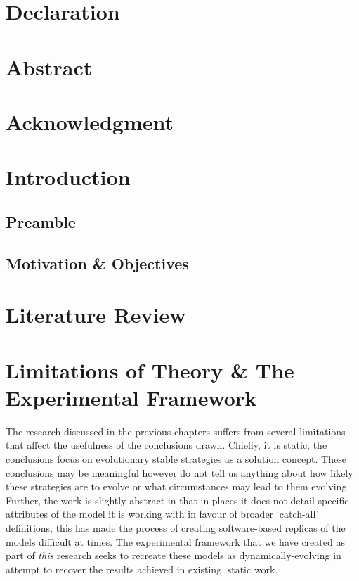 \documentclass[11pt]{book}
\begin{document}
\newpage
\chapter*{Declaration}
\chapter*{Abstract}
\chapter*{Acknowledgment}

\tableofcontents
\newpage
\chapter{Introduction}
\section{Preamble}
\section{Motivation \& Objectives}

\chapter{Literature Review}

\chapter[Theory vs. Practice]{Limitations of Theory \& The Experimental Framework}

The research discussed in the previous chapters suffers from several limitations that affect the usefulness of the conclusions drawn. 
Chiefly, it is static; the conclusions focus on evolutionary stable strategies as a solution concept.
These conclusions may be meaningful however do not tell us anything about how likely these strategies are to evolve or what circumstances may lead to them evolving.
Further, the work is slightly abstract in that in places it does not detail specific attributes of the model it is working with in favour of broader `catch-all' definitions,
this has made the process of creating software-based replicas of the models difficult at times.
The experimental framework that we have created as part of \textit{this} research seeks to recreate these models as dynamically-evolving in attempt to recover the results achieved in existing, static work.
\end{document}
